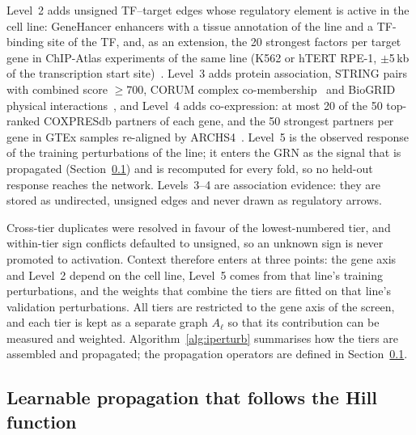Level~2 adds unsigned TF--target edges whose regulatory element is active in the cell line: GeneHancer enhancers with a tissue annotation of the line and a TF-binding site of the TF, and, as an extension, the 20 strongest factors per target gene in ChIP-Atlas experiments of the same line (K562 or hTERT RPE-1, $\pm$5\,kb of the transcription start site)~\cite{zou2024chipatlas}.
Level~3 adds protein association, STRING pairs with combined score $\ge 700$, CORUM complex co-membership~\cite{tsitsiridis2023corum} and BioGRID physical interactions~\cite{oughtred2021biogrid}, and Level~4 adds co-expression: at most 20 of the 50 top-ranked COXPRESdb partners of each gene, and the 50 strongest partners per gene in GTEx samples re-aligned by ARCHS4~\cite{gtex2020atlas,lachmann2018archs4}.
Level~5 is the observed response of the training perturbations of the line; it enters the GRN as the signal that is propagated (Section~\ref{sec:model}) and is recomputed for every fold, so no held-out response reaches the network.
Levels~3--4 are association evidence: they are stored as undirected, unsigned edges and never drawn as regulatory arrows.

Cross-tier duplicates were resolved in favour of the lowest-numbered tier, and within-tier sign conflicts defaulted to unsigned, so an unknown sign is never promoted to activation.
Context therefore enters at three points: the gene axis and Level~2 depend on the cell line, Level~5 comes from that line's training perturbations, and the weights that combine the tiers are fitted on that line's validation perturbations.
All tiers are restricted to the gene axis of the screen, and each tier is kept as a separate graph $A_\ell$ so that its contribution can be measured and weighted.
Algorithm~\ref{alg:iperturb} summarises how the tiers are assembled and propagated; the propagation operators are defined in Section~\ref{sec:model}.


\subsection{Learnable propagation that follows the Hill function}
\label{sec:model}
